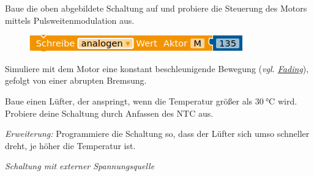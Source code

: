 \begin{aufgabe}
	
	Baue die oben abgebildete Schaltung auf und probiere die Steuerung des Motors mittels Pulsweitenmodulation aus.
	
	\begin{figure}[H]
		\centering
		\includegraphics[width=0.5\linewidth]{./pics/pwm-motorsteuerung.png}
	\end{figure}
	
	Simuliere mit dem Motor eine konstant beschleunigende Bewegung (\emph{vgl. \href{sec:pwm}{Fading}}), gefolgt von einer abrupten Bremsung.
\end{aufgabe}

\begin{projekt}\label{proj:luefter}
	Baue einen Lüfter, der anspringt, wenn die Temperatur größer als $\SI{30}{\celsius}$ wird. Probiere deine Schaltung durch Anfassen des NTC aus.
	
	\emph{Erweiterung:} Programmiere die Schaltung so, dass der Lüfter sich umso schneller dreht, je höher die Temperatur ist.
\end{projekt}

\newpage
\emph{Schaltung mit externer Spannungsquelle}
\medskip

